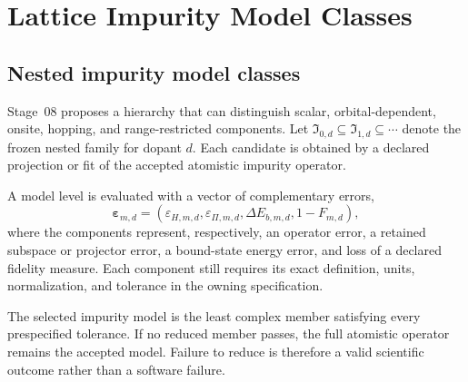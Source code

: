 \chapter{Lattice Impurity Model Classes}

\label{ch:lattice-impurity-models}


\section{Nested impurity model classes}


Stage~08 proposes a hierarchy that can distinguish scalar, orbital-dependent,
onsite, hopping, and range-restricted components. Let
$\mathfrak I_{0,d}\subseteq\mathfrak I_{1,d}\subseteq\cdots$ denote the frozen
nested family for dopant $d$. Each candidate is obtained by a declared
projection or fit of the accepted atomistic impurity operator.

A model level is evaluated with a vector of complementary errors,
\begin{equation}
  \boldsymbol\varepsilon_{m,d}
  =
  \left(
    \varepsilon_{H,m,d},
    \varepsilon_{\Pi,m,d},
    \Delta E_{b,m,d},
    1-F_{m,d}
  \right),
\end{equation}
where the components represent, respectively, an operator error, a retained
subspace or projector error, a bound-state energy error, and loss of a declared
fidelity measure. Each component still requires its exact definition, units,
normalization, and tolerance in the owning specification.

The selected impurity model is the least complex member satisfying every
prespecified tolerance. If no reduced member passes, the full atomistic
operator remains the accepted model. Failure to reduce is therefore a valid
scientific outcome rather than a software failure.
